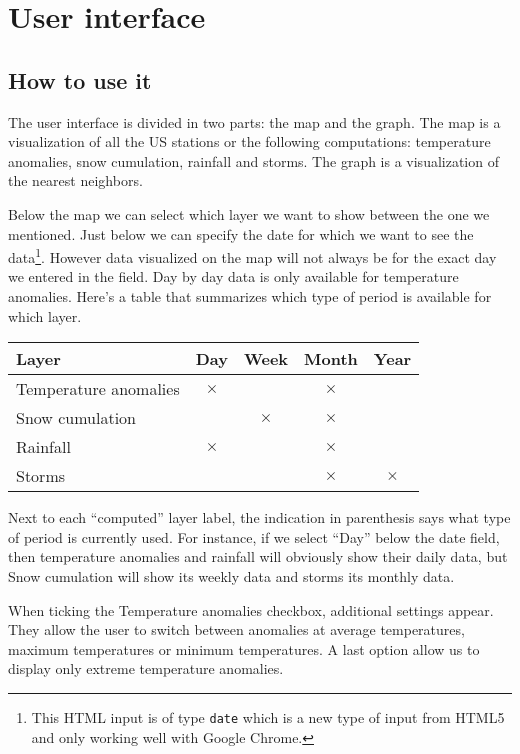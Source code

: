 \section{User interface}
\subsection{How to use it}
The user interface is divided in two parts: the map and the graph. The map is a visualization of all the US stations or the following computations: temperature anomalies, snow cumulation, rainfall and storms. The graph is a visualization of the nearest neighbors.

Below the map we can select which layer we want to show between the one we mentioned. Just below we can specify the date for which we want to see the data\footnote{This HTML input is of type \texttt{date} which is a new type of input from HTML5 and only working well with Google Chrome.}. However data visualized on the map will not always be for the exact day we entered in the field. Day by day data is only available for temperature anomalies. Here's a table that summarizes which type of period is available for which layer.
\begin{center}
\begin{tabular}{|l|c|c|c|c|}\hline \textbf{Layer} & \textbf{Day} & \textbf{Week} & \textbf{Month} & \textbf{Year} \\\hline Temperature anomalies & $\times$ &  & $\times$ &  \\\hline Snow cumulation &  & $\times$ & $\times$ &  \\\hline Rainfall & $\times$ &  & $\times$ &  \\\hline Storms &  &  & $\times$ & $\times$ \\\hline \end{tabular}
\end{center}

Next to each “computed” layer label, the indication in parenthesis says what type of period is currently used. For instance, if we select “Day” below the date field, then temperature anomalies and rainfall will obviously show their daily data, but Snow cumulation will show its weekly data and storms its monthly data.

When ticking the Temperature anomalies checkbox, additional settings appear. They allow the user to switch between anomalies at average temperatures, maximum temperatures or minimum temperatures. A last option allow us to display only extreme temperature anomalies.

